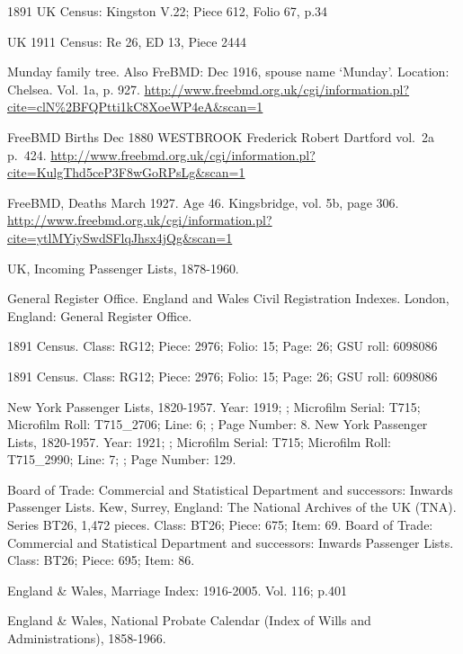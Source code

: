 \begin{thebibliography}{99}
{
	1891 UK Census: Kingston V.22; Piece 612, Folio 67, p.34 
	
	UK 1911 Census: Re 26, ED 13, Piece 2444
	
	Munday family tree.
	Also FreBMD: Dec 1916, spouse name `Munday'. Location: Chelsea. Vol. 1a, p. 927.
	\url{http://www.freebmd.org.uk/cgi/information.pl?cite=clN\%2BFQPtti1kC8XoeWP4eA&scan=1}

	FreeBMD Births Dec 1880
	WESTBROOK Frederick Robert Dartford vol.~2a p.~424.
	\url{http://www.freebmd.org.uk/cgi/information.pl?cite=KulgThd5ceP3F8wGoRPsLg&scan=1}

	 FreeBMD, Deaths March 1927. Age 46. Kingsbridge, vol. 5b, page 306.
	\url{http://www.freebmd.org.uk/cgi/information.pl?cite=ytlMYiySwdSFlqJhsx4jQg&scan=1}

	UK, Incoming Passenger Lists, 1878-1960. 
	
	General Register Office. England and Wales Civil Registration Indexes. London, England: General Register Office. 
	
	 1891 Census. Class: RG12; Piece: 2976; Folio: 15; Page: 26; GSU roll: 6098086
	 
	1891 Census. Class: RG12; Piece: 2976; Folio: 15; Page: 26; GSU roll: 6098086
	
	New York Passenger Lists, 1820-1957.
	Year: 1919; ; Microfilm Serial: T715; Microfilm Roll: T715_2706; Line: 6; ; Page Number: 8.
	New York Passenger Lists, 1820-1957.
	Year: 1921; ; Microfilm Serial: T715; Microfilm Roll: T715_2990; Line: 7; ; Page Number: 129.
	
	Board of Trade: Commercial and Statistical Department and successors: Inwards Passenger Lists. Kew, Surrey, England: The National Archives of the UK (TNA). Series BT26, 1,472 pieces.
	Class: BT26; Piece: 675; Item: 69.
	Board of Trade: Commercial and Statistical Department and successors: Inwards Passenger Lists.
	Class: BT26; Piece: 695; Item: 86.
	
	England & Wales, Marriage Index: 1916-2005. Vol. 116; p.401

	 England & Wales, National Probate Calendar (Index of Wills and Administrations), 1858-1966. 
	
}
\end{thebibliography}
